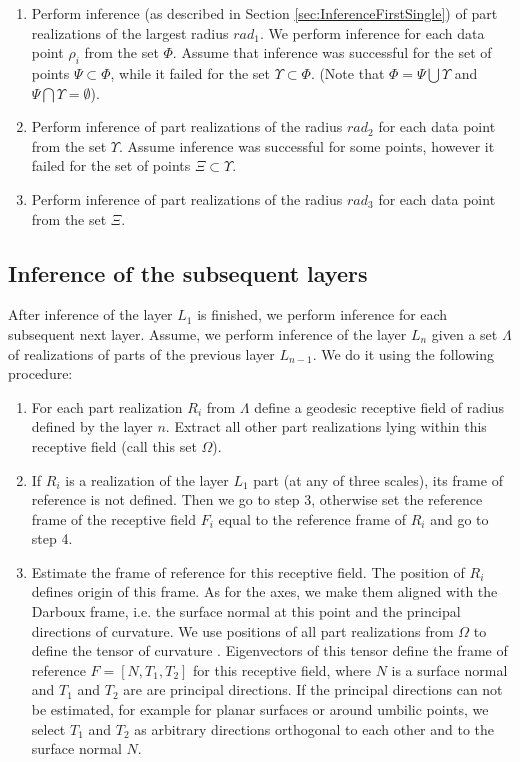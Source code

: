 \documentclass[conference]{IEEEtran}
\begin{document}
{\begin{enumerate}
\item Perform inference (as described in Section
\ref{sec:InferenceFirstSingle}) of part realizations of the largest
radius $rad_1$. We perform inference for each data point $\rho_i$
from the set $\Phi$. Assume that inference was successful for the
set of points $\Psi \subset \Phi$, while it failed for the set
$\Upsilon \subset \Phi$. (Note that $\Phi = \Psi \bigcup \Upsilon$
and $\Psi \bigcap \Upsilon = \emptyset$).

\item Perform inference of part realizations of the
radius $rad_2$ for each data point from the set $\Upsilon$. Assume
inference was successful for some points, however it failed for the
set of points $\Xi \subset \Upsilon$.

\item Perform inference of part realizations of the
radius $rad_3$ for each data point from the set $\Xi$.

\end{enumerate}


\subsection{Inference of the subsequent layers\label{sec:InferenceNext}}

After inference of the layer $L_1$ is finished, we perform inference
for each subsequent next layer. Assume, we perform inference of the
layer $L_n$ given a set $\Lambda$ of realizations of parts of the
previous layer $L_{n-1}$. We do it using the following procedure:

\begin{enumerate}

\item For each part realization $R_i$ from $\Lambda$ define a geodesic receptive
field of radius defined by the layer $n$. Extract all other part
realizations lying within this receptive field (call this set
$\Omega$).

\item If $R_i$ is a realization of the layer $L_1$ part (at any of three scales), its frame of reference is not defined.
Then we go to step 3, otherwise set the reference frame of the
receptive field $F_i$ equal to the reference frame of $R_i$ and go
to step 4.

\item Estimate the frame of reference for this receptive field. The position of $R_i$ defines origin of this
frame. As for the axes, we make them aligned with the Darboux frame,
i.e. the surface normal at this point and the principal directions
of curvature. We use positions of all part realizations from
$\Omega$ to define the tensor of curvature
\cite{taubin1995estimating}. Eigenvectors of this tensor define the
frame of reference $F = [N, T_1, T_2]$ for this receptive field,
where $N$ is a surface normal and $T_1$ and $T_2$ are are principal
directions. If the principal directions can not be estimated, for
example for planar surfaces or around umbilic points, we select
$T_1$ and $T_2$ as arbitrary directions orthogonal to each other and
to the surface normal $N$.


\end{enumerate}}
\end{document}

